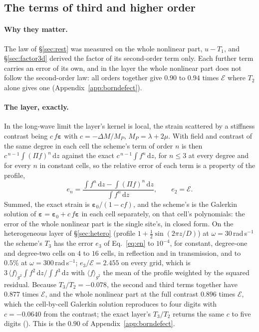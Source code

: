 \documentclass[11pt,a4paper]{article}
\newcommand{\cE}{\mathcal{E}}
\newcommand{\dd}{\mathrm{d}}
\begin{document}
\subsection{The terms of third and higher order}\label{sec:higher}

\paragraph{Why they matter.} The law of \S\ref{sec:rest} was measured on the whole nonlinear part,
$u-T_1$, and \S\ref{sec:factor3d} derived the factor of its second-order term only. Each further term
carries an error of its own, and in the layer the whole nonlinear part does not follow the
second-order law: all orders together give $0.90$ to $0.94$ times $\cE$ where $T_2$ alone gives one
(Appendix~\ref{app:borndefect}).

\paragraph{The layer, exactly.} In the long-wave limit the layer's kernel is local, the strain scattered
by a stiffness contrast being $c\,f\boldsymbol\varepsilon$ with $c=-\Delta M/M_P$, $M_P=\lambda+2\mu$. With
field and contrast of the same degree in each cell the scheme's term of order $n$ is then
$c^{\,n-1}\!\int(\Pi f)^n\,\dd z$ against the exact $c^{\,n-1}\!\int f^n\,\dd z$, for $n\le3$ at every degree and for
every $n$ in constant cells, so the relative error of each term is a property of the profile,
\begin{equation}\label{eq:en}
  e_n=\frac{\int f^n\,\dd z-\int(\Pi f)^n\,\dd z}{\int f^n\,\dd z},\qquad e_2=\cE .
\end{equation}
Summed, the exact strain is $\boldsymbol\varepsilon_0/(1-cf)$, and the scheme's is the Galerkin solution
of $\boldsymbol\varepsilon=\boldsymbol\varepsilon_0+c\,f\boldsymbol\varepsilon$ in each cell separately,
on that cell's polynomials: the error of the whole nonlinear part is the single site's, in closed form.
On the heterogeneous layer of \S\ref{sec:hetero} (profile $1+\tfrac12\sin(2\pi z/D)$) at
$\omega=30$\,rad\,s$^{-1}$ the scheme's $T_3$ has the error $e_3$ of Eq.~\eqref{eq:en} to $10^{-4}$, for
constant, degree-one and degree-two cells on $4$ to $16$ cells, in reflection and in transmission, and to
$0.5\%$ at $\omega=300$\,rad\,s$^{-1}$; $e_3/\cE=2.455$ on every grid, which is
$3\,\langle f\rangle_{g^2}\int f^2\,\dd z/\int f^3\,\dd z$ with $\langle f\rangle_{g^2}$ the mean of the profile weighted
by the squared residual. Because $T_3/T_2=-0.078$, the second and third terms together have $0.877$ times
$\cE$, and the whole nonlinear part at the full contrast $0.896$ times $\cE$, which the cell-by-cell
Galerkin solution reproduces to four digits with $c=-0.0640$ from the contrast; the exact layer's
$T_3/T_2$ returns the same $c$ to five digits (). This is the
$0.90$ of Appendix~\ref{app:borndefect}.
\end{document}
